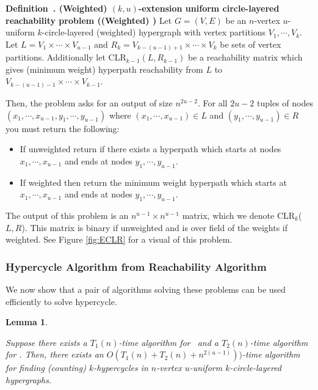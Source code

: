 \documentclass[11pt,letterpaper,pdftex]{article}
\newtheorem{lemma}[theorem]{Lemma}
\newcounter{definition}
\newenvironment{definition}[1][]{\refstepcounter{definition}\par\medskip
   \noindent \textbf{Definition~\thedefinition. #1} \rmfamily}{\medskip}
\begin{document}
\begin{definition}[(Weighted) $(k,u)$-extension uniform circle-layered reachability problem ((Weighted) \uECLR{u}{k})] \label{def: uk-ECLR}
Let $G=(V,E)$ be an $n$-vertex $u$-uniform $k$-circle-layered (weighted) hypergraph with vertex partitions $V_1, \cdots, V_{k}$. 
Let $L=V_1 \times \cdots \times V_{u-1}$ and $R_k=V_{k-(u-1)+1} \times \cdots \times V_{k}$ be sets of vertex partitions.
Additionally let CLR$_{k-1}(L, R_{k-1})$ be a reachability matrix which gives (minimum weight) hyperpath reachability from $L$ to $V_{k-(u-1)-1} \times \cdots \times V_{k-1}$.

Then, the  problem asks for an output of size $n^{2u-2}$. 
For all $2u-2$ tuples of nodes \\
$(x_1, \cdots, x_{u-1}, y_1, \cdots, y_{u-1})$  where $(x_1, \cdots, x_{u-1}) \in L$ and  $(y_1, \cdots, y_{u-1}) \in R$ you must return the following:
\begin{itemize}
    \item If unweighted return if there exists a hyperpath which starts at nodes $x_1, \cdots, x_{u-1}$ and ends at nodes $ y_1, \cdots, y_{u-1}$. 
    \item If weighted then return the minimum weight hyperpath which starts at $x_1, \cdots, x_{u-1}$ and ends at nodes $ y_1, \cdots, y_{u-1}$. 
\end{itemize}
  
The output of this problem is an $n^{u-1} \times n^{u-1}$ matrix, which we denote CLR$_k$($L,R$). This matrix is binary if unweighted and is over field of the weights if weighted. See Figure \ref{fig:ECLR} for a visual of this problem. 
\end{definition}

\subsubsection{Hypercycle Algorithm from Reachability Algorithm}

We now show that a pair of algorithms solving these problems can be used efficiently to solve hypercycle.

\begin{lemma} \label{lem: dp-like algorithm}
    
Suppose there exists a $T_1(n)$-time algorithm for \uCLR~and a $T_2(n)$-time algorithm for . 
Then, there exists an $O(T_1(n)+T_2(n)+n^{2(u-1)}))$-time algorithm for finding (counting) $k$-hypercycles in $n$-vertex $u$-uniform $k$-circle-layered hypergraphs.
\end{lemma}
\end{document}
